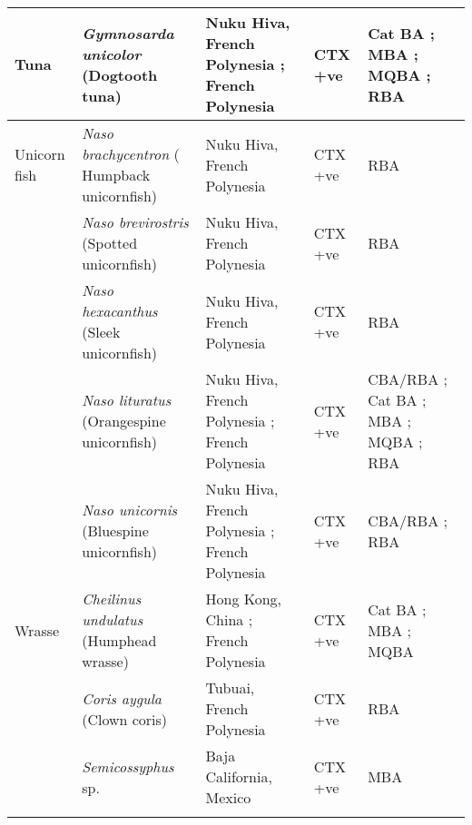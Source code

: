 \documentclass[12pt]{article}
\begin{document}
\begin{longtable}{  | p{2cm} | p{3cm} | p{4.5cm}  | p{2cm} | p{3cm}  | }
\hline
Tuna  &  \emph{Gymnosarda unicolor} (Dogtooth tuna) &  Nuku Hiva, French Polynesia \cite{darius2007ciguatera}; French Polynesia \cite{bagnis1987use}  & CTX +ve \cite{darius2007ciguatera,bagnis1987use} & Cat BA \cite{bagnis1987use}; MBA \cite{bagnis1987use}; MQBA \cite{bagnis1987use}; RBA \cite{darius2007ciguatera}\\
\hline
Unicorn fish  & \emph{Naso brachycentron} ( Humpback unicornfish)  & Nuku Hiva, French Polynesia \cite{darius2007ciguatera}  & CTX +ve \cite{darius2007ciguatera} & RBA \cite{darius2007ciguatera} \\
  & \emph{Naso brevirostris} (Spotted unicornfish) & Nuku Hiva, French Polynesia \cite{darius2007ciguatera} & CTX +ve \cite{darius2007ciguatera} & RBA \cite{darius2007ciguatera} \\
  &  \emph{Naso hexacanthus} (Sleek unicornfish) & Nuku Hiva, French Polynesia \cite{darius2007ciguatera} & CTX +ve \cite{darius2007ciguatera} & RBA \cite{darius2007ciguatera} \\
  & \emph{Naso lituratus} (Orangespine unicornfish)  & Nuku Hiva, French Polynesia \cite{darius2007ciguatera}; French Polynesia \cite{chinain2014mail,bagnis1987use} & CTX +ve \cite{darius2007ciguatera,bagnis1987use,chinain2014mail} & CBA/RBA \cite{chinain2014mail}; Cat BA \cite{bagnis1987use}; MBA \cite{bagnis1987use}; MQBA \cite{bagnis1987use}; RBA \cite{darius2007ciguatera}\\
  & \emph{Naso unicornis} (Bluespine unicornfish) & Nuku Hiva, French Polynesia \cite{darius2007ciguatera}; French Polynesia \cite{chinain2014mail} & CTX +ve \cite{darius2007ciguatera,chinain2014mail} & CBA/RBA \cite{chinain2014mail}; RBA \cite{darius2007ciguatera}  \\
 Wrasse &  \emph{Cheilinus undulatus} (Humphead wrasse) & Hong Kong, China \cite{wong2005study,wong2009solid}; French Polynesia \cite{bagnis1987use}  & CTX +ve \cite{bagnis1987use,wong2005study,wong2009solid} & Cat BA \cite{bagnis1987use}; MBA \cite{bagnis1987use,wong2005study,wong2009solid}; MQBA \cite{bagnis1987use} \\
  & \emph{Coris aygula} (Clown coris) & Tubuai, French Polynesia \cite{darius2007ciguatera} & CTX +ve \cite{darius2007ciguatera} & RBA \cite{darius2007ciguatera} \\
  & \emph{Semicossyphus} sp. & Baja California, Mexico \cite{lechuga1995documented} & CTX +ve \cite{lechuga1995documented} & MBA \cite{lechuga1995documented}\\
  \hline
  &  \emph{} &  &  & \\

\end{longtable}
\end{document}
